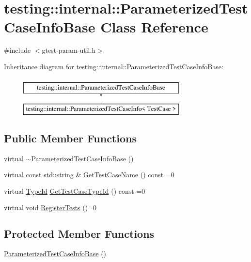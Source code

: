 \hypertarget{classtesting_1_1internal_1_1ParameterizedTestCaseInfoBase}{}\section{testing\+::internal\+::Parameterized\+Test\+Case\+Info\+Base Class Reference}
\label{classtesting_1_1internal_1_1ParameterizedTestCaseInfoBase}


{\ttfamily \#include $<$gtest-\/param-\/util.\+h$>$}

Inheritance diagram for testing\+::internal\+::Parameterized\+Test\+Case\+Info\+Base\+:\begin{figure}[H]
\begin{center}
\leavevmode
\includegraphics[height=2.000000cm]{classtesting_1_1internal_1_1ParameterizedTestCaseInfoBase}
\end{center}
\end{figure}
\subsection*{Public Member Functions}
\begin{DoxyCompactItemize}
\item 
virtual \mbox{\hyperlink{classtesting_1_1internal_1_1ParameterizedTestCaseInfoBase_affae85e908f0901a8f0f1f9576843e35}{$\sim$\+Parameterized\+Test\+Case\+Info\+Base}} ()
\item 
virtual const std\+::string \& \mbox{\hyperlink{classtesting_1_1internal_1_1ParameterizedTestCaseInfoBase_ac69b3bc29debfd6d891b7f5b2d088b1c}{Get\+Test\+Case\+Name}} () const =0
\item 
virtual \mbox{\hyperlink{namespacetesting_1_1internal_ab1114197d3c657d8b7f8e0c5caa12d00}{Type\+Id}} \mbox{\hyperlink{classtesting_1_1internal_1_1ParameterizedTestCaseInfoBase_a932b4a9185a72d5bdfa5fd84fc06cbca}{Get\+Test\+Case\+Type\+Id}} () const =0
\item 
virtual void \mbox{\hyperlink{classtesting_1_1internal_1_1ParameterizedTestCaseInfoBase_a92baca6c64c822c2e7043217f7903ef2}{Register\+Tests}} ()=0
\end{DoxyCompactItemize}
\subsection*{Protected Member Functions}
\begin{DoxyCompactItemize}
\item 
\mbox{\hyperlink{classtesting_1_1internal_1_1ParameterizedTestCaseInfoBase_a48d0d6c661d0d5b6b404f1add3704aaf}{Parameterized\+Test\+Case\+Info\+Base}} ()
\end{DoxyCompactItemize}


